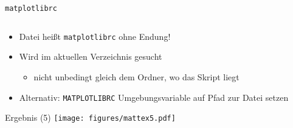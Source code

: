 \begin{frame}[fragile]{\texttt{matplotlibrc}}
  \inputminted{text}{../common/matplotlibrc}

  \begin{itemize}
    \item Datei heißt \texttt{matplotlibrc} ohne Endung!
    \item Wird im aktuellen Verzeichnis gesucht
      \begin{itemize}
        \item nicht unbedingt gleich dem Ordner, wo das Skript liegt
      \end{itemize}
    \item Alternativ: \texttt{MATPLOTLIBRC} Umgebungsvariable auf Pfad zur Datei setzen
  \end{itemize}
\end{frame}

\AddToShipoutPictureFG*{\ShowFramePicture}
\begin{frame}{Ergebnis (5)}
  \centering
  \texttt{[image: figures/mattex5.pdf]}
\end{frame}
